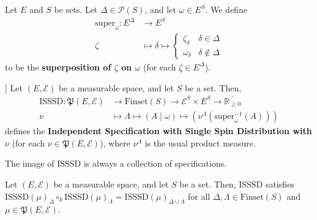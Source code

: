 
\begin{definition}[Superposition]
    \label{def:superposition}
    \leanok
    Let $E$ and $S$ be sets. Let $\Delta\in\mathcal{P}(S)$, and let $\omega\in E^S$. We define
    \begin{align*}
        \text{super}_\omega:E^\Delta&\to E^S\\
        \zeta&\mapsto \delta\mapsto\begin{cases}
            \zeta_\delta & \delta\in\Delta\\
            \omega_\delta & \delta\notin\Delta
        \end{cases}
    \end{align*}
    to be the \textbf{superposition of $\zeta$ on $\omega$} (for each $\zeta\in E^\Delta$).
\end{definition}

\begin{definition}[Independent Specification with Single Spin Distribution [ISSSD]]
    \label{def:ISSSD}
    Let $(E,\mathcal{E})$ be a measurable space, and let $S$ be a set. Then,
    \begin{align*}
        \text{ISSSD}:\mathfrak{P}(E,\mathcal{E})&\to\text{Finset}(S)\to\mathcal{E}^S\times E^S\to\overline{\mathbb{R}_{\geq0}}\\
        \nu&\mapsto\Lambda\mapsto(A\mid\omega)\mapsto\left(\nu^\Lambda\left(\text{super}_\omega^{-1}(A)\right)\right)
    \end{align*}
    defines the \textbf{Independent Specification with Single Spin Distribution with $\nu$} (for each $\nu\in\mathfrak{P}(E,\mathcal{E})$), where $\nu^\Lambda$ is the usual product measure.
\end{definition}

\begin{lemma}
    \label{lem:isssd-specification}
    \lean{}
    The image of $\text{ISSSD}$ is always a collection of specifications.
\end{lemma}

\begin{lemma}
    \label{lem:isssd-strong-consistency}
    \lean{}
    Let $(E,\mathcal{E})$ be a measurable space, and let $S$ be a set. Then, $\text{ISSSD}$ satisfies $\text{ISSSD}(\mu)_\Delta\circ_k\text{ISSSD}(\mu)_\Lambda=\text{ISSSD}(\mu)_{\Delta\cup\Lambda}$ for all $\Delta,\Lambda\in\text{Finset}(S)$ and $\mu\in\mathfrak{P}(E,\mathcal{E})$.
\end{lemma}

